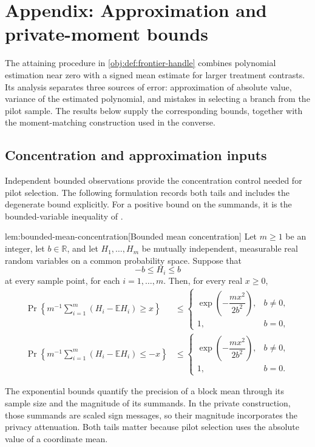 \section{Appendix: Approximation and private-moment bounds}

The attaining procedure in \cref{obj:def:frontier-handle} combines polynomial estimation near zero with a signed mean estimate for larger treatment contrasts. Its analysis separates three sources of error: approximation of absolute value, variance of the estimated polynomial, and mistakes in selecting a branch from the pilot sample. The results below supply the corresponding bounds, together with the moment-matching construction used in the converse.

\subsection{Concentration and approximation inputs}

Independent bounded observations provide the concentration control needed for pilot selection. The following formulation records both tails and includes the degenerate bound explicitly. For a positive bound on the summands, it is the bounded-variable inequality of \citet[Theorem~2]{Hoeffding1963Bounded}.

\begin{theoremv}{lem:bounded-mean-concentration}[Bounded mean concentration]
Let \(m\ge1\) be an integer, let \(b\in\mathbb R\), and let \(H_1,\ldots,H_m\) be mutually independent, measurable real random variables on a common probability space. Suppose that
\[
-b\le H_i\le b
\]
at every sample point, for each \(i=1,\ldots,m\). Then, for every real \(x\ge0\),
\[
\begin{aligned}
\Pr\left\{m^{-1}\sum_{i=1}^m(H_i-\mathbb E H_i)\ge x\right\}
&\le
\begin{cases}
\exp\!\left(-\dfrac{mx^2}{2b^2}\right),& b\ne0,\\
1,& b=0,
\end{cases}\\
\Pr\left\{m^{-1}\sum_{i=1}^m(H_i-\mathbb E H_i)\le -x\right\}
&\le
\begin{cases}
\exp\!\left(-\dfrac{mx^2}{2b^2}\right),& b\ne0,\\
1,& b=0.
\end{cases}
\end{aligned}
\]
\end{theoremv}

The exponential bounds quantify the precision of a block mean through its sample size and the magnitude of its summands. In the private construction, those summands are scaled sign messages, so their magnitude incorporates the privacy attenuation. Both tails matter because pilot selection uses the absolute value of a coordinate mean.

